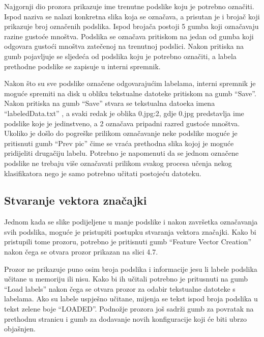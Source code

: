 \documentclass[times, utf8, zavrsni]{fer}
\begin{document}
\newpage

Najgornji dio prozora prikazuje ime trenutne podslike koju je potrebno označiti.
Ispod naziva se nalazi konkretna slika koja se označava, a prisutan je i brojač
koji prikazuje broj označenih podslika. Ispod brojača postoji 5 gumba koji
označavaju razine gustoće mnoštva. Podslika se označava pritiskom na jedan
od gumba koji odgovara gustoći mnoštva zatečenoj na trenutnoj podslici. Nakon pritiska
na gumb pojavljuje se sljedeća od podslika koju je potrebno označiti, a labela
prethodne podslike se zapisuje u interni spremnik. 

\bigbreak

Nakon što su sve podslike označene
odgovarajućim labelama, interni spremnik je moguće spremiti na disk u obliku 
tekstualne datoteke pritiskom na gumb \enquote{Save}. Nakon pritiska na gumb
\enquote{Save} stvara se tekstualna datoeka imena \enquote{labeledData.txt}
, a svaki redak je oblika 0.jpg:2, gdje 0.jpg predstavlja ime podslike koje 
je jedinstveno, a 2 označava pripadni razred gustoće mnoštva. Ukoliko je 
došlo do pogreške prilikom označavanje neke podslike moguće je pritisnuti
gumb \enquote{Prev pic} čime se vraća prethodna slika kojoj je moguće pridijeliti
drugačiju labelu. Potrebno je napomenuti da se jednom označene podslike ne trebaju 
više označavati prilikom svakog procesa učenja nekog klasifikatora nego 
je samo potrebno učitati postojeću datoteku.

\subsection{Stvaranje vektora značajki}

Jednom kada se slike podijeljene u manje podslike i nakon završetka označavanja
svih podslika, moguće je pristupiti postupku stvaranja vektora značajki. 
Kako bi pristupili tome prozoru, potrebno je pritisnuti gumb \enquote{Feature Vector Creation} 
nakon čega se otvara prozor prikazan na slici 4.7.

Prozor ne prikazuje puno osim broja podslika i informacije jesu li labele
podslika učitane u memoriju ili nisu. Kako bi ih učitali potrebno je pritusnuti
na gumb \enquote{Load labels} nakon čega se otvara prozor za odabir tekstualne datoteke
s labelama. Ako su labele uspješno učitane, mijenja se tekst ispod broja
podslika u tekst zelene boje \enquote{LOADED}. Podnožje prozora još sadrži gumb
za povratak na prethodnu stranicu i gumb za dodavanje novih konfiguracije koji će biti
ubrzo objašnjen. 
\end{document}
